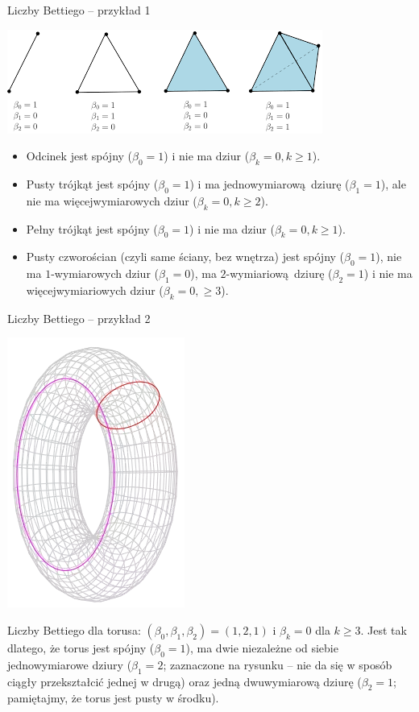 \documentclass{beamer}
\begin{document}
\begin{frame}{Liczby Bettiego -- przykład 1}

\begin{center}
	\includegraphics[scale = 0.7]{LiczbyBettiego.png}
\end{center}

\begin{itemize}
	\item Odcinek jest spójny ($\beta_0 = 1$) i nie ma dziur ($\beta_k = 0, k \geq 1$).
	\item Pusty trójkąt jest spójny ($\beta_0 = 1$) i ma jednowymiarową dziurę ($\beta_1 = 1$), ale nie ma więcejwymiarowych dziur ($\beta_k = 0, k \geq 2$).
	\item Pełny trójkąt jest spójny ($\beta_0 = 1$) i nie ma dziur ($\beta_k = 0, k \geq 1$).
	\item Pusty czworościan (czyli same ściany, bez wnętrza) jest spójny ($\beta_0 = 1$), nie ma $1$-wymiarowych dziur ($\beta_1 = 0$), ma $2$-wymiariową dziurę ($\beta_2 = 1$) i nie ma więcejwymiariowych dziur ($\beta_k = 0, \geq 3$).
\end{itemize}

\end{frame}

\begin{frame}{Liczby Bettiego -- przykład 2}

\begin{center}
	\includegraphics[scale = 1.5]{GrupyHomologiiTorusa.png}
\end{center}

Liczby Bettiego dla torusa: $(\beta_0, \beta_1, \beta_2) = (1, 2, 1)$ i $\beta_k = 0$ dla $k \geq 3$. Jest tak dlatego, że torus jest spójny ($\beta_0 = 1$), ma dwie niezależne od siebie jednowymiarowe dziury ($\beta_1 = 2$; zaznaczone na rysunku -- nie da się w sposób ciągły przekształcić jednej w drugą) oraz jedną dwuwymiarową dziurę ($\beta_2 = 1$; pamiętajmy, że torus jest pusty w środku).
	
\end{frame}
	
\end{document}
